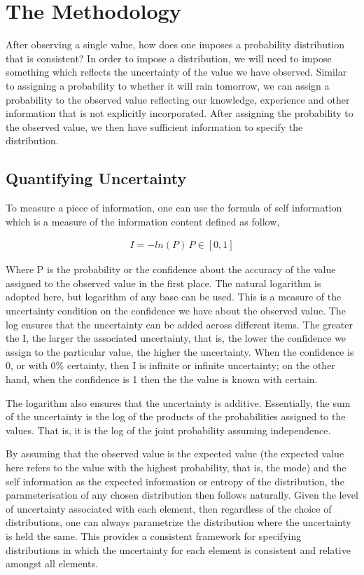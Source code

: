 \documentclass[nojss]{jss}\usepackage[]{graphicx}\usepackage[]{color}
\begin{document}
\section{The Methodology}

After observing a single value, how does one imposes a probability
distribution that is consistent? In order to impose a distribution, we
will need to impose something which reflects the uncertainty of the
value we have observed.  Similar to assigning a probability to whether
it will rain tomorrow, we can assign a probability to the observed
value reflecting our knowledge, experience and other information that
is not explicitly incorporated. After assigning the probability to the
observed value, we then have sufficient information to specify the
distribution.


\subsection{Quantifying Uncertainty}

To measure a piece of information, one can use the formula of self
information which is a measure of the information content defined as
follow,

\begin{align}
  I = -ln(P) \, P \in [0, 1]
\end{align}


Where P is the probability or the confidence about the accuracy of the
value assigned to the observed value in the first place. The natural
logarithm is adopted here, but logarithm of any base can be used. This
is a measure of the uncertainty condition on the confidence we have
about the observed value. The log ensures that the uncertainty can be
added across different items. The greater the I, the larger the
associated uncertainty, that is, the lower the confidence we assign to
the particular value, the higher the uncertainty. When the confidence
is 0, or with 0\% certainty, then I is infinite or infinite
uncertainty; on the other hand, when the confidence is 1 then the the
value is known with certain.

The logarithm also ensures that the uncertainty is
additive. Essentially, the sum of the uncertainty is the log of the
products of the probabilities assigned to the values. That is, it is
the log of the joint probability assuming independence.

By assuming that the observed value is the expected value (the
expected value here refers to the value with the highest probability,
that is, the mode) and the self information as the expected
information or entropy of the distribution, the parameterisation of
any chosen distribution then follows naturally. Given the level of
uncertainty associated with each element, then regardless of the
choice of distributions, one can always parametrize the distribution
where the uncertainty is held the same. This provides a consistent
framework for specifying distributions in which the uncertainty for
each element is consistent and relative amongst all elements.
\end{document}

